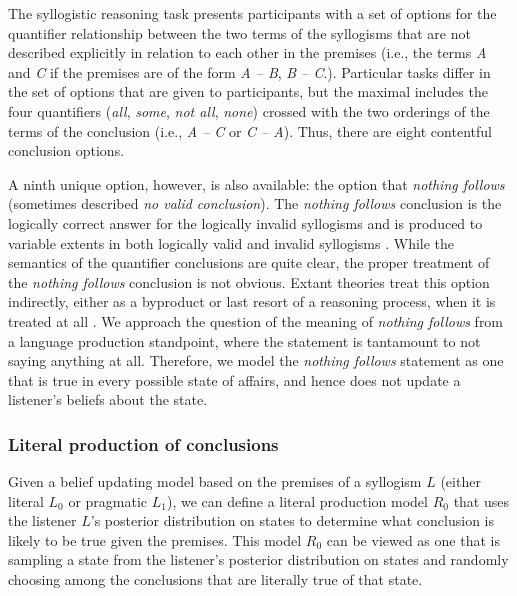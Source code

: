 \documentclass[floatsintext, doc]{apa6}
\begin{document}
The syllogistic reasoning task presents participants with a set of options for the quantifier relationship between the two terms of the syllogisms that are not described explicitly in relation to each other in the premises (i.e., the terms \emph{A} and \emph{C} if the premises are of the form \emph{A -- B}, \emph{B -- C}.). 
Particular tasks differ in the set of options that are given to participants, but the maximal includes the four quantifiers  (\emph{all}, \emph{some}, \emph{not all}, \emph{none}) crossed with the two orderings of the terms of the conclusion (i.e., \emph{A -- C} or \emph{C -- A}).
Thus, there are eight contentful conclusion options. 

A ninth unique option, however, is also available: the option that \emph{nothing follows} (sometimes described \emph{no valid conclusion}). 
The \emph{nothing follows} conclusion is the logically correct answer for the logically invalid syllogisms and is produced to variable extents in both logically valid and invalid syllogisms \cite{Khemlani2012}.
While the semantics of the quantifier conclusions are quite clear, the proper treatment of the \emph{nothing follows} conclusion is not obvious. 
Extant theories treat this option indirectly, either as a byproduct or last resort of a reasoning process, when it is treated at all \cite{ragni2019does, riesterer2020modeling}.
We approach the question of the meaning of \emph{nothing follows} from a language production standpoint, where the statement is tantamount to not saying anything at all. 
Therefore, we model the \emph{nothing follows} statement as one that is true in every possible state of affairs, and hence does not update a listener's beliefs about the state. 


\subsubsection{Literal production of conclusions}

Given a belief updating model based on the premises of a syllogism $L$ (either literal $L_0$ or pragmatic $L_1$), we can define a literal production model $R_0$ that uses the listener $L$'s posterior distribution on states to determine what conclusion is likely to be true given the premises. 
This model $R_0$ can be viewed as one that is sampling a state from the listener's posterior distribution on states and randomly choosing among the conclusions that are literally true of that state. 
\end{document}
